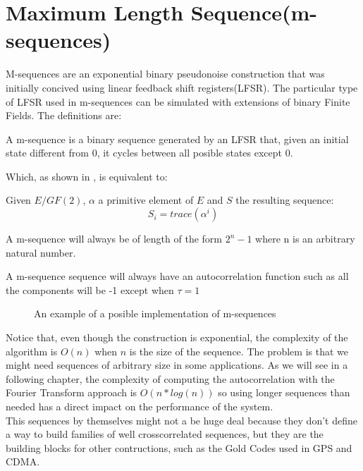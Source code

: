 \section{Maximum Length Sequence(m-sequences)}

M-sequences are an exponential binary pseudonoise construction that was
initially concived using linear feedback shift registers(LFSR). The particular
type of LFSR used in m-sequences can be simulated with extensions of binary
Finite Fields. The definitions are:

\begin{definition}[LFSR]
  A m-sequence is a binary sequence generated by an LFSR that, given an initial
  state different from 0, it cycles between all posible states except 0.
\end{definition}

Which, as shown in \citet{golomb_ref}, is equivalent to:

\begin{definition}
  Given $E/GF(2)$, $\alpha$ a primitive element of $E$ and $S$ the resulting
  sequence:
  \begin{equation}
    S_{i} = trace(\alpha^{i})
  \end{equation}
\end{definition}

\begin{property}
  A m-sequence will always be of length of the form $2^{n}-1$ where n is an
  arbitrary natural number.
\end{property}

\begin{property}
  A m-sequence sequence will always have an autocorrelation function such as
  all the components will be -1 except when $\tau = 1$
\end{property}

\begin{figure}[ht!]
  \caption{An example of a posible implementation of m-sequences}
  \label{mls:fig:1}
\end{figure}

Notice that, even though the construction is exponential, the complexity of
the algorithm is $O(n)$ when $n$ is the size of the sequence. The problem is
that we might need sequences of arbitrary size in some applications. As we will
see in a following chapter, the complexity of computing the autocorrelation
with the Fourier Transform approach is $O(n*log(n))$ so using longer sequences
than needed has a direct impact on the performance of the system. \\

This sequences by themselves might not a be huge deal because they don't define
a way to build families of well crosscorrelated sequences, but they are the
building blocks for other contructions, such as the Gold Codes used in GPS and
CDMA.
